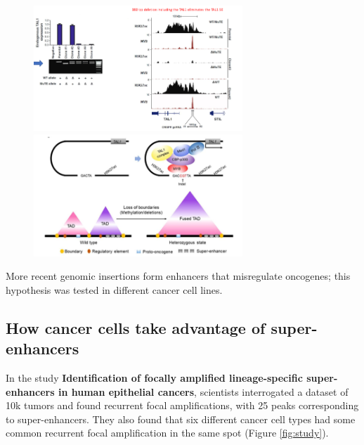 \begin{figure}[!htb]
   \begin{minipage}{0.48\textwidth}
     \centering
    \includegraphics[width=0.7\textwidth]{../_resources/dfb8371fc17e078308c3d5aa247ebcbf.png}
\caption{}
\label{fig:deltal}
   \end{minipage}\hfill
   \begin{minipage}{0.48\textwidth}
     \centering
     \includegraphics[width=0.7\textwidth]{../_resources/8bd5f4820c364c35b02c35eb0e48f464.png}
\caption{}
\label{fig:sup}
   \end{minipage}
\end{figure}

More recent genomic insertions form enhancers that misregulate oncogenes; this hypothesis was tested in different cancer cell lines.

\hypertarget{how-cancer-cells-take-advantage-of-super-enhancers}{%
\subsection{How cancer cells take advantage of super-enhancers}\label{how-cancer-cells-take-advantage-of-super-enhancers}}

In the study \textbf{Identification of focally amplified lineage-specific super-enhancers in human epithelial cancers}, scientists interrogated a dataset of 10k tumors and found recurrent focal amplifications, with 25 peaks corresponding to super-enhancers. They also found that six different cancer cell types had some common recurrent focal amplification in the same spot (Figure \ref{fig:study}).

